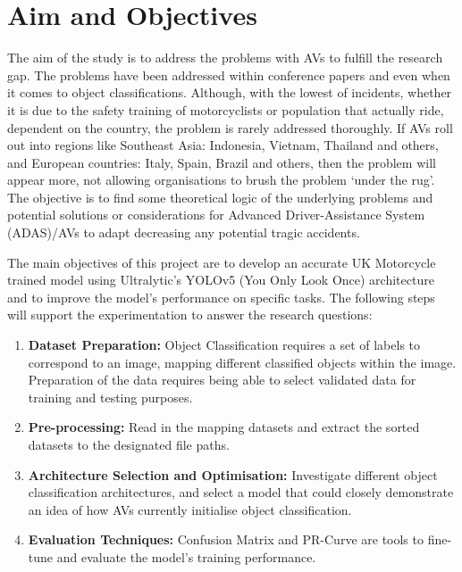 \documentclass[12pt]{report} %
\begin{document}
	\section{Aim and Objectives}
        The aim of the study is to address the problems with AVs to fulfill the research gap. The problems have been addressed within conference papers and even when it comes to object classifications. Although, with the lowest of incidents, whether it is due to the safety training of motorcyclists or population that actually ride, dependent on the country, the problem is rarely addressed thoroughly. If AVs roll out into regions like Southeast Asia: Indonesia, Vietnam, Thailand and others, and European countries: Italy, Spain, Brazil and others, then the problem will appear more, not allowing organisations to brush the problem `under the rug'. The objective is to find some theoretical logic of the underlying problems and potential solutions or considerations for Advanced Driver-Assistance System (ADAS)/AVs to adapt decreasing any potential tragic accidents.

		The main objectives of this project are to develop an accurate UK Motorcycle trained model using Ultralytic's YOLOv5 (You Only Look Once) architecture and to improve the model's performance on specific tasks. The following steps will support the experimentation to answer the research questions:

        \begin{enumerate}
            \item \textbf{Dataset Preparation:} Object Classification requires a set of labels to correspond to an image, mapping different classified objects within the image. Preparation of the data requires being able to select validated data for training and testing purposes.
            \item \textbf{Pre-processing:} Read in the mapping datasets and extract the sorted datasets to the designated file paths. 
            \item \textbf{Architecture Selection and Optimisation:} Investigate different object classification architectures, and select a model that could closely demonstrate an idea of how AVs currently initialise object classification.
            \item \textbf{Evaluation Techniques:} Confusion Matrix and PR-Curve are tools to fine-tune and evaluate the model's training performance.
        \end{enumerate}
\end{document}
